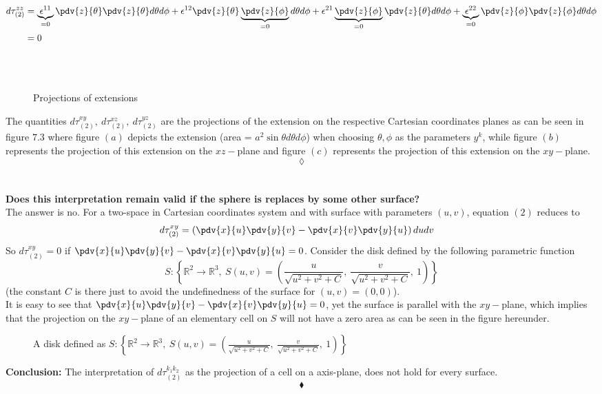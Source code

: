 \begin{align}
d\tau_{(2)}^{zz}&= \underbrace{\epsilon^{11}}_{=0}\pdv{z}{\theta}\pdv{z}{\theta}d{\theta}d{\phi}+\epsilon^{12}\pdv{z}{\theta}\underbrace{\pdv{z}{\phi}}_{=0}d{\theta}d{\phi}+\epsilon^{21}\underbrace{\pdv{z}{\phi}}_{=0}\pdv{z}{\theta}d{\theta}d{\phi}+\underbrace{\epsilon^{22}}_{=0}\pdv{z}{\phi}\pdv{z}{\phi}d{\theta}d{\phi}\\
&=0
\end{align}
\begin{figure}[H]%
    \centering
    \subfloat[]{}\\
    \subfloat[]{}\\
    \subfloat[]{}
\caption{Projections of extensions}
\label{fig:fig_p257}
\end{figure}
The quantities $d\tau_{(2)}^{xy},\ d\tau_{(2)}^{xz},  \ d\tau_{(2)}^{yz}$ are the projections of the extension on the respective Cartesian coordinates planes as can be seen in figure $7.3$ where figure $(a)$ depicts the extension (area = $a^2\sin{\theta}d\theta d\phi$) when choosing $\theta,\phi$ as the parameters $y^k$, while figure $(b)$ represents the projection of this extension on the $xz-$plane and figure $(c)$ represents the projection of this extension on the $xy-$plane.$$\lozenge$$ \\\\
\textbf{Does this interpretation remain valid if the sphere is replaces by some other surface?}
\\
The answer is no. For a two-space in Cartesian coordinates system  and with surface with parameters $(u,v)$, equation $(2)$ reduces to 
\begin{align}
d\tau_{(2)}^{xy}&= \left(\pdv{x}{u}\pdv{y}{v}-\pdv{x}{v}\pdv{y}{u}\right)dudv
\end{align}
So $d\tau_{(2)}^{xy}=0$ if $\pdv{x}{u}\pdv{y}{v}-\pdv{x}{v}\pdv{y}{u}=0$.
Consider the disk defined by the following parametric function
$$S: \left\{\mathbb{R}^2\rightarrow \mathbb{R}^3, \ S(u,v)= \left(\frac{u}{\sqrt{u^2+v^2+C}},\ \frac{v}{\sqrt{u^2+v^2+C}}, \ 1\right)\right\}$$ 
(the constant $C$ is there just to avoid the undefinedness of the surface for $(u,v) = (0,0)$). \\
It is easy to see that $\pdv{x}{u}\pdv{y}{v}-\pdv{x}{v}\pdv{y}{u}=0$, yet the surface is parallel with the $xy-$plane, which implies that the projection on the $xy-$plane of an elementary cell on $S$ will not have a zero area as can be seen in the figure hereunder. 

\begin{figure}[H]%
    \centering
    
\caption{A disk defined as $S: \left\{\mathbb{R}^2\rightarrow \mathbb{R}^3, \ S(u,v)= \left(\frac{u}{\sqrt{u^2+v^2+C}},\ \frac{v}{\sqrt{u^2+v^2+C}}, \ 1\right)\right\}$}
\label{fig:fig_p257}
\end{figure}
\textbf{Conclusion:} The interpretation of  $d\tau_{(2)}^{k_1k_2}$ as the projection of a cell on a axis-plane, does not hold for every surface.
$$\blacklozenge$$
\newpage

